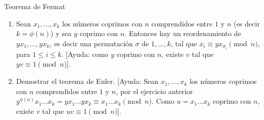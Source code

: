 \begin{section}{Teorema de Fermat}
\begin{enumerate}
\item Sean $x_1,\ldots,x_k$ los números coprimos con $n$ comprendidos
entre $1$ y $n$ (es decir $k=\phi(n)$) y sea $y$ coprimo con $n$.
Entonces hay un reordenamiento de $yx_1,\ldots,yx_k$, es decir una
permutación $\sigma$ de $1,\ldots,k$, tal que $x_i \equiv
yx_{\sigma_i} \pmod{n}$, para $1\le i \le k$. [Ayuda: como $y$
coprimo con $n$, existe $v$ tal que $yv\equiv 1\pmod{n}$].

\item \label{demdeeuler}Demostrar el teorema de Euler. [Ayuda: Sean $x_1,\ldots,x_k$ los
números coprimos con $n$ comprendidos entre $1$ y $n$, por el
ejercicio anterior $y^{\phi(n)}x_1\ldots x_k =yx_1\ldots yx_k
\equiv x_1\ldots x_k \pmod{n}$. Como $u=x_1\ldots x_k$ coprimo con
$n$, existe $v$ tal que $uv\equiv 1\pmod{n}$].
\end{enumerate}

\end{section}


